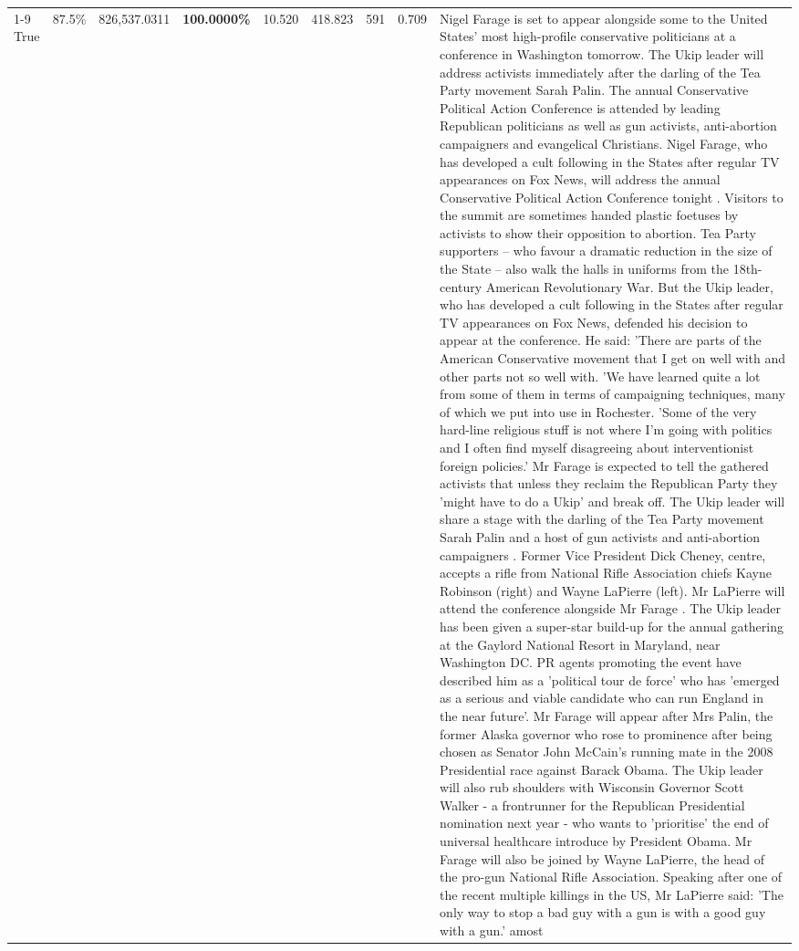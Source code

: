\begin{table}[H]
\begin{tabular}{lllrlllll}
\cline{1-9}
True & 87.5\% & 826,537.0311 & \bfseries \color{red} 100.0000\% & 10.520 & 418.823 & 591 & 0.709 & Nigel Farage is set to appear alongside some to the United States' most high-profile conservative politicians at a conference in Washington tomorrow. The Ukip leader will address activists immediately after the darling of the Tea Party movement Sarah Palin. The annual Conservative Political Action Conference is attended by leading Republican politicians as well as gun activists, anti-abortion campaigners and evangelical Christians. Nigel Farage, who has developed a cult following in the States after regular TV appearances on Fox News, will address the annual Conservative Political Action Conference tonight . Visitors to the summit are sometimes handed plastic foetuses by activists to show their opposition to abortion. Tea Party supporters – who favour a dramatic reduction in the size of the State – also walk the halls in uniforms from the 18th-century American Revolutionary War. But the Ukip leader, who has developed a cult following in the States after regular TV appearances on Fox News, defended his decision to appear at the conference. He said: 'There are parts of the American Conservative movement that I get on well with and other parts not so well with. 'We have learned quite a lot from some of them in terms of campaigning techniques, many of which we put into use in Rochester. 'Some of the very hard-line religious stuff is not where I'm going with politics and I often find myself disagreeing about interventionist foreign policies.' Mr Farage is expected to tell the gathered activists that unless they reclaim the Republican Party they 'might have to do a Ukip' and break off. The Ukip leader will share a stage with the darling of the Tea Party movement Sarah Palin and a host of gun activists and anti-abortion campaigners . Former Vice President Dick Cheney, centre, accepts a rifle from National Rifle Association chiefs Kayne Robinson (right) and Wayne LaPierre (left). Mr LaPierre will attend the conference alongside Mr Farage . The Ukip leader has been given a super-star build-up for the annual gathering at the Gaylord National Resort in Maryland, near Washington DC. PR agents promoting the event have described him as a 'political tour de force' who has 'emerged as a serious and viable candidate who can run England in the near future'. Mr Farage will appear after Mrs Palin, the former Alaska governor who rose to prominence after being chosen as Senator John McCain's running mate in the 2008 Presidential race against Barack Obama. The Ukip leader will also rub shoulders with Wisconsin Governor Scott Walker - a frontrunner for the Republican Presidential nomination next year - who wants to 'prioritise' the end of universal healthcare introduce by President Obama. Mr Farage will also be joined by Wayne LaPierre, the head of the pro-gun National Rifle Association. Speaking after one of the recent multiple killings in the US, Mr LaPierre said: 'The only way to stop a bad guy with a gun is with a good guy with a gun.' amost \\

\end{tabular}
\end{table}
